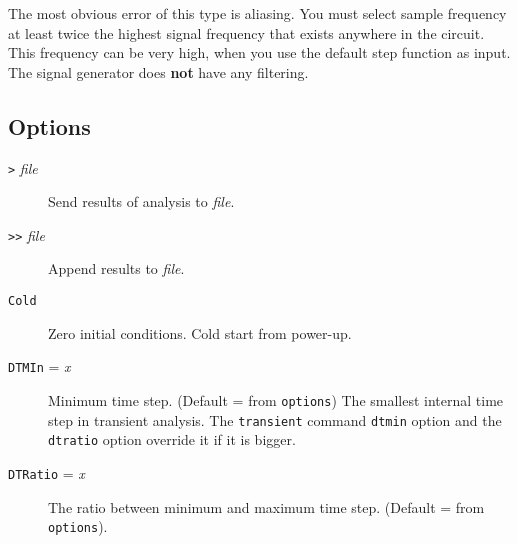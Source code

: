 The most obvious error of this type is aliasing.  You must select sample
frequency at least twice the highest signal frequency that exists anywhere in
the circuit.  This frequency can be very high, when you use the default step
function as input.  The signal generator does {\bf not} have any filtering.
\subsection{Options}

\begin{description}


\item[{\tt >} {\it file}] Send results of analysis to {\it file}.

\item[{\tt >>} {\it file}] Append results to {\it file}.



\item[{\tt Cold}] Zero initial conditions.  Cold start from
power-up.



\item[{\tt DTMIn} = {\it x}] Minimum time step.  (Default = from
{\tt options})  The smallest internal time step in transient
analysis.  The {\tt transient} command {\tt dtmin} option and the
{\tt dtratio} option override it if it is bigger.

\item[{\tt DTRatio} = {\it x}] The ratio between minimum and maximum
time step.  (Default = from {\tt options}).



\end{description}
